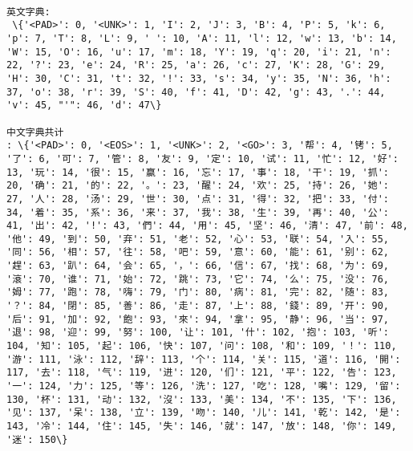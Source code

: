 \documentclass[11pt]{article}
\begin{document}
    \begin{Verbatim}[commandchars=\\\{\}]

英文字典:
 \{'<PAD>': 0, '<UNK>': 1, 'I': 2, 'J': 3, 'B': 4, 'P': 5, 'k': 6, 'p': 7, 'T': 8, 'L': 9, ' ': 10, 'A': 11, 'l': 12, 'w': 13, 'b': 14, 'W': 15, 'O': 16, 'u': 17, 'm': 18, 'Y': 19, 'q': 20, 'i': 21, 'n': 22, '?': 23, 'e': 24, 'R': 25, 'a': 26, 'c': 27, 'K': 28, 'G': 29, 'H': 30, 'C': 31, 't': 32, '!': 33, 's': 34, 'y': 35, 'N': 36, 'h': 37, 'o': 38, 'r': 39, 'S': 40, 'f': 41, 'D': 42, 'g': 43, '.': 44, 'v': 45, "'": 46, 'd': 47\}

中文字典共计
: \{'<PAD>': 0, '<EOS>': 1, '<UNK>': 2, '<GO>': 3, '帮': 4, '铐': 5, '了': 6, '可': 7, '管': 8, '友': 9, '定': 10, '试': 11, '忙': 12, '好': 13, '玩': 14, '很': 15, '赢': 16, '忘': 17, '事': 18, '干': 19, '抓': 20, '确': 21, '的': 22, '。': 23, '醒': 24, '欢': 25, '持': 26, '她': 27, '人': 28, '汤': 29, '世': 30, '点': 31, '得': 32, '把': 33, '付': 34, '着': 35, '系': 36, '来': 37, '我': 38, '生': 39, '再': 40, '公': 41, '出': 42, '!': 43, '們': 44, '用': 45, '坚': 46, '清': 47, '前': 48, '他': 49, '到': 50, '弃': 51, '老': 52, '心': 53, '联': 54, '入': 55, '同': 56, '相': 57, '往': 58, '吧': 59, '意': 60, '能': 61, '别': 62, '趕': 63, '趴': 64, '会': 65, '，': 66, '信': 67, '找': 68, '为': 69, '滾': 70, '谁': 71, '始': 72, '跳': 73, '它': 74, '么': 75, '没': 76, '姆': 77, '跑': 78, '嗨': 79, '门': 80, '病': 81, '完': 82, '随': 83, '？': 84, '閉': 85, '善': 86, '走': 87, '上': 88, '錢': 89, '开': 90, '后': 91, '加': 92, '飽': 93, '來': 94, '拿': 95, '静': 96, '当': 97, '退': 98, '迎': 99, '努': 100, '让': 101, '什': 102, '抱': 103, '听': 104, '知': 105, '起': 106, '快': 107, '问': 108, '和': 109, '！': 110, '游': 111, '泳': 112, '辞': 113, '个': 114, '关': 115, '道': 116, '開': 117, '去': 118, '气': 119, '进': 120, '们': 121, '平': 122, '告': 123, '一': 124, '力': 125, '等': 126, '洗': 127, '吃': 128, '嘴': 129, '留': 130, '杯': 131, '动': 132, '沒': 133, '美': 134, '不': 135, '下': 136, '见': 137, '呆': 138, '立': 139, '吻': 140, '儿': 141, '乾': 142, '是': 143, '冷': 144, '住': 145, '失': 146, '就': 147, '放': 148, '你': 149, '迷': 150\}

    \end{Verbatim}
\end{document}

